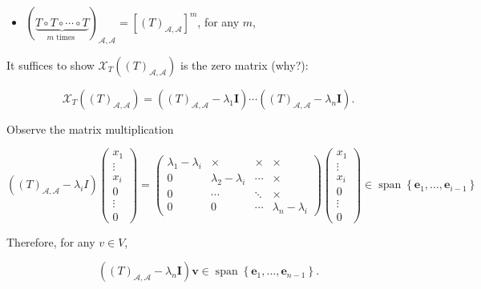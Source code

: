 \documentclass[11pt]{article}
\begin{document}
\begin{itemize}
\item \({\left( \underset{m\text{ times }}{\underbrace{T \circ  T \circ  \cdots  \circ  T}}\right) }_{\mathcal{A},\mathcal{A}} = {\left\lbrack  {\left( T\right) }_{\mathcal{A},\mathcal{A}}\right\rbrack  }^{m}\), for any \(m\),
\end{itemize}

It suffices to show \({\mathcal{X}}_{T}\left( {\left( T\right) }_{\mathcal{A},\mathcal{A}}\right)\) is the zero matrix (why?):

\[
{\mathcal{X}}_{T}\left( {\left( T\right) }_{\mathcal{A},\mathcal{A}}\right)  = \left( {{\left( T\right) }_{\mathcal{A},\mathcal{A}} - {\lambda }_1\mathbf{I}}\right) \cdots \left( {{\left( T\right) }_{\mathcal{A},\mathcal{A}} - {\lambda }_n\mathbf{I}}\right) .
\]

Observe the matrix multiplication

\[
\left( {{\left( T\right) }_{\mathcal{A},\mathcal{A}} - {\lambda }_{i}I}\right) \left( \begin{matrix} {x}_1 \\  \vdots \\  {x}_{i} \\  0 \\  \vdots \\  0 \end{matrix}\right)  = \left( \begin{matrix} {\lambda }_1 - {\lambda }_{i} &  \times  &  \times  &  \times  \\  0 & {\lambda }_2 - {\lambda }_{i} & \cdots &  \times  \\  0 & \cdots &  \ddots  &  \times  \\  0 & 0 & \cdots & {\lambda }_n - {\lambda }_{i} \end{matrix}\right) \left( \begin{matrix} {x}_1 \\  \vdots \\  {x}_{i} \\  0 \\  \vdots \\  0 \end{matrix}\right)  \in  \operatorname{span}\left\{  {{\mathbf{e}}_1,\ldots ,{\mathbf{e}}_{i - 1}}\right\}
\]

Therefore, for any \(v \in  V\),

\[
\left( {{\left( T\right) }_{\mathcal{A},\mathcal{A}} - {\lambda }_n\mathbf{I}}\right) \mathbf{v} \in  \operatorname{span}\left\{  {{\mathbf{e}}_1,\ldots ,{\mathbf{e}}_{n - 1}}\right\}  .
\]
\end{document}
